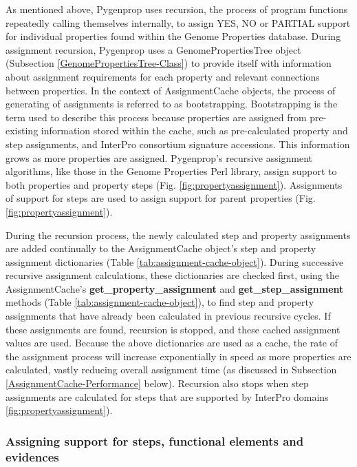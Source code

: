 As mentioned above, Pygenprop uses recursion, the process of program functions repeatedly calling themselves internally, to assign YES, NO or PARTIAL support for individual properties found within the Genome Properties database. During assignment recursion, Pygenprop uses a GenomePropertiesTree object (Subsection \ref{GenomePropertiesTree-Class}) to provide itself with information about assignment requirements for each property and relevant connections between properties. In the context of AssignmentCache objects, the process of generating of assignments is referred to as bootstrapping. Bootstrapping is the term used to describe this process because properties are assigned from pre-existing information stored within the cache, such as pre-calculated property and step assignments, and InterPro consortium signature accessions. This information grows as more properties are assigned. Pygenprop's recursive assignment algorithms, like those in the Genome Properties Perl library, assign support to both properties and property steps (Fig. \ref{fig:propertyassignment}). Assignments of support for steps are used to assign support for parent properties (Fig. \ref{fig:propertyassignment}).

During the recursion process, the newly calculated step and property assignments are added continually to the AssignmentCache object's step and property assignment dictionaries (Table \ref{tab:assignment-cache-object}). During successive recursive assignment calculations, these dictionaries are checked first, using the AssignmentCache's \textbf{get\_property\_assignment} and \textbf{get\_step\_assignment} methods (Table \ref{tab:assignment-cache-object}), to find step and property assignments that have already been calculated in previous recursive cycles. If these assignments are found, recursion is stopped, and these cached assignment values are used. Because the above dictionaries are used as a cache, the rate of the assignment process will increase exponentially in speed as more properties are calculated, vastly reducing overall assignment time (as discussed in Subsection \ref{AssignmentCache-Performance} below). Recursion also stops when step assignments are calculated for steps that are supported by InterPro domains \ref{fig:propertyassignment}).

\subsubsection{Assigning support for steps, functional elements and evidences}

